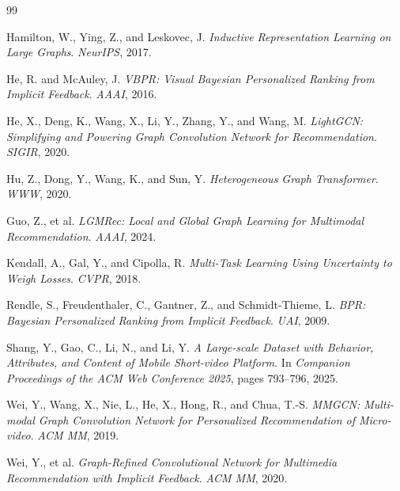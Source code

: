 \documentclass[12pt, a4paper]{article}
\begin{document}

\begin{thebibliography}{99}

Hamilton, W., Ying, Z., and Leskovec, J.
\newblock \emph{Inductive Representation Learning on Large Graphs}.
\newblock \textit{NeurIPS}, 2017.

He, R. and McAuley, J.
\newblock \emph{VBPR: Visual Bayesian Personalized Ranking from Implicit Feedback}.
\newblock \textit{AAAI}, 2016.

He, X., Deng, K., Wang, X., Li, Y., Zhang, Y., and Wang, M.
\newblock \emph{LightGCN: Simplifying and Powering Graph Convolution Network for Recommendation}.
\newblock \textit{SIGIR}, 2020.

Hu, Z., Dong, Y., Wang, K., and Sun, Y.
\newblock \emph{Heterogeneous Graph Transformer}.
\newblock \textit{WWW}, 2020.

Guo, Z., et al.
\newblock \emph{LGMRec: Local and Global Graph Learning for Multimodal Recommendation}.
\newblock \textit{AAAI}, 2024.

Kendall, A., Gal, Y., and Cipolla, R.
\newblock \emph{Multi-Task Learning Using Uncertainty to Weigh Losses}.
\newblock \textit{CVPR}, 2018.

Rendle, S., Freudenthaler, C., Gantner, Z., and Schmidt-Thieme, L.
\newblock \emph{BPR: Bayesian Personalized Ranking from Implicit Feedback}.
\newblock \textit{UAI}, 2009.

Shang, Y., Gao, C., Li, N., and Li, Y.
\newblock \emph{A Large-scale Dataset with Behavior, Attributes, and Content
  of Mobile Short-video Platform}.
\newblock In \textit{Companion Proceedings of the ACM Web Conference 2025},
  pages 793--796, 2025.

Wei, Y., Wang, X., Nie, L., He, X., Hong, R., and Chua, T.-S.
\newblock \emph{MMGCN: Multi-modal Graph Convolution Network for Personalized
  Recommendation of Micro-video}.
\newblock \textit{ACM MM}, 2019.

Wei, Y., et al.
\newblock \emph{Graph-Refined Convolutional Network for Multimedia Recommendation
  with Implicit Feedback}.
\newblock \textit{ACM MM}, 2020.


\end{thebibliography}
\end{document}
